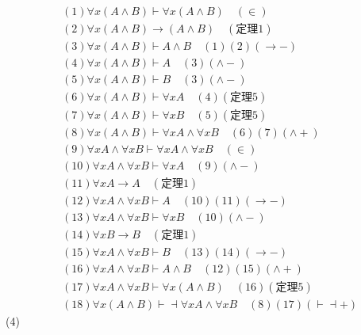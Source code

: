 \documentclass{article}
\begin{document}
\[
\begin{aligned}
&(1)\forall x (A \wedge B) \vdash \forall x (A \wedge B) \quad (\in) \\
&(2)\forall x (A \wedge B) \to (A \wedge B) \quad (\mbox{定理}1) \\
&(3)\forall x (A \wedge B) \vdash A \wedge B \quad (1)(2)(\to -) \\
&(4)\forall x (A \wedge B) \vdash A \quad (3)(\wedge -) \\
&(5)\forall x (A \wedge B) \vdash B \quad (3)(\wedge -) \\
&(6)\forall x (A \wedge B) \vdash \forall x A \quad (4)(\mbox{定理}5) \\
&(7)\forall x (A \wedge B) \vdash \forall x B \quad (5)(\mbox{定理}5) \\
&(8)\forall x (A \wedge B) \vdash \forall x A \wedge \forall x B \quad (6)(7)(\wedge +) \\
&(9)\forall x A \wedge \forall x B \vdash \forall x A \wedge \forall x B \quad (\in) \\
&(10)\forall x A \wedge \forall x B \vdash \forall x A \quad (9)(\wedge -) \\
&(11)\forall x A \to A \quad (\mbox{定理}1) \\
&(12)\forall x A \wedge \forall x B \vdash A \quad (10)(11)(\to -) \\
&(13)\forall x A \wedge \forall x B \vdash \forall x B \quad (10)(\wedge -) \\
&(14)\forall x B \to B \quad (\mbox{定理}1) \\
&(15)\forall x A \wedge \forall x B \vdash B \quad (13)(14)(\to -) \\
&(16)\forall x A \wedge \forall x B \vdash A \wedge B \quad (12)(15)(\wedge +) \\
&(17)\forall x A \wedge \forall x B \vdash \forall x (A \wedge B) \quad (16)(\mbox{定理}5) \\ 
&(18)\forall x (A \wedge B) \vdash \dashv \forall x A \wedge \forall x B \quad (8)(17)(\vdash \dashv  +)
\end{aligned}    
\]
(4)
\end{document}
